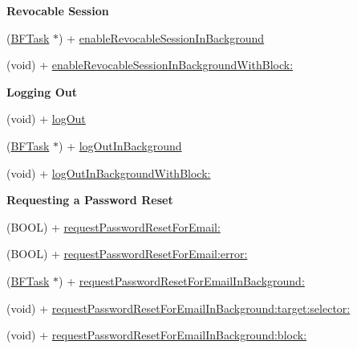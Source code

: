 \begin{Indent}{\bf Revocable Session}\par
{\em 

 

 }\begin{DoxyCompactItemize}
\item 
(\hyperlink{interface_b_f_task}{B\+F\+Task} $\ast$) + \hyperlink{interface_p_f_user_a231bae82068e0f554f5ac366bce8254c}{enable\+Revocable\+Session\+In\+Background}
\item 
(void) + \hyperlink{interface_p_f_user_a8163f28f8a1658c49e7530ab491ce0fb}{enable\+Revocable\+Session\+In\+Background\+With\+Block\+:}
\end{DoxyCompactItemize}
\end{Indent}
\begin{Indent}{\bf Logging Out}\par
{\em 

 

 }\begin{DoxyCompactItemize}
\item 
(void) + \hyperlink{interface_p_f_user_a7ffecb9e2df4f9ccaa353c88e7c280da}{log\+Out}
\item 
(\hyperlink{interface_b_f_task}{B\+F\+Task} $\ast$) + \hyperlink{interface_p_f_user_aca199554d1011f4fad8016225f6e1e80}{log\+Out\+In\+Background}
\item 
(void) + \hyperlink{interface_p_f_user_a1badbc4dac94437b400ab6080a75c4f8}{log\+Out\+In\+Background\+With\+Block\+:}
\end{DoxyCompactItemize}
\end{Indent}
\begin{Indent}{\bf Requesting a Password Reset}\par
{\em 

 

 }\begin{DoxyCompactItemize}
\item 
(B\+O\+O\+L) + \hyperlink{interface_p_f_user_ae33ea54b2e63b9e6c746e3a9b2b8efe7}{request\+Password\+Reset\+For\+Email\+:}
\item 
(B\+O\+O\+L) + \hyperlink{interface_p_f_user_a7d829d9ec1c63e219e635899ce065a87}{request\+Password\+Reset\+For\+Email\+:error\+:}
\item 
(\hyperlink{interface_b_f_task}{B\+F\+Task} $\ast$) + \hyperlink{interface_p_f_user_add34cb785c49c79c4e60b8f8c05348b8}{request\+Password\+Reset\+For\+Email\+In\+Background\+:}
\item 
(void) + \hyperlink{interface_p_f_user_af94600d1c796e8e0a9bc9e8286e12ff5}{request\+Password\+Reset\+For\+Email\+In\+Background\+:target\+:selector\+:}
\item 
(void) + \hyperlink{interface_p_f_user_a72f4bbe5f95199fda91283ec1682ed25}{request\+Password\+Reset\+For\+Email\+In\+Background\+:block\+:}
\end{DoxyCompactItemize}
\end{Indent}
